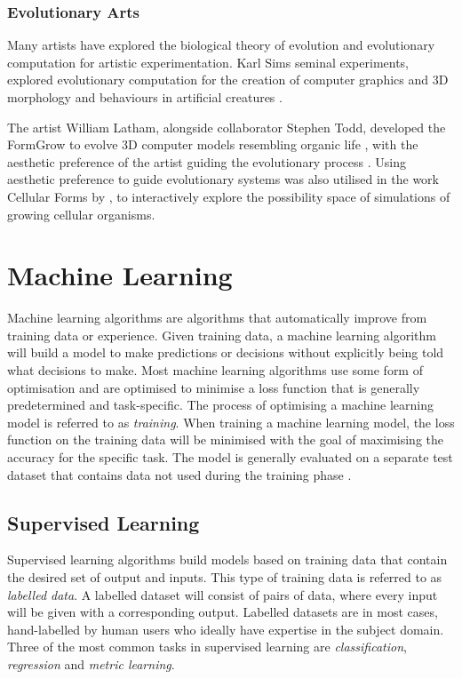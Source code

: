 \subsubsection{Evolutionary Arts}

Many artists have explored the biological theory of evolution and evolutionary computation for artistic experimentation.
Karl Sims seminal experiments, explored evolutionary computation for the creation of computer graphics \citep{sims1991artificial} and 3D morphology and behaviours in artificial creatures \citep{sims1994evolving, sims2023evolving}.

The artist William Latham, alongside collaborator Stephen Todd, developed the FormGrow to evolve 3D computer models resembling organic life \citep{latham1992evolutionary}, with the aesthetic preference of the artist guiding the evolutionary process \citep{lambert2013emergence}.
Using aesthetic preference to guide evolutionary systems was also utilised in the work Cellular Forms by \citep{lomas2014cellular}, to interactively explore the possibility space of simulations of growing cellular organisms.

\section{Machine Learning}
\label{c2:sec:ml}
Machine learning algorithms are algorithms that automatically improve from training data or experience. 
Given training data, a machine learning algorithm will build a model to make predictions or decisions without explicitly being told what decisions to make. 
Most machine learning algorithms use some form of optimisation and are optimised to minimise a loss function that is generally predetermined and task-specific. 
The process of optimising a machine learning model is referred to as \emph{training}. 
When training a machine learning model, the loss function on the training data will be minimised with the goal of maximising the accuracy for the specific task. 
The model is generally evaluated on a separate test dataset that contains data not used during the training phase \citep{murphy2012machine}.

\subsection{Supervised Learning}

Supervised learning algorithms build models based on training data that contain the desired set of output and inputs. 
This type of training data is referred to as \emph{labelled data}. 
A labelled dataset will consist of pairs of data, where every input will be given with a corresponding output. 
Labelled datasets are in most cases, hand-labelled by human users who ideally have expertise in the subject domain. 
Three of the most common tasks in supervised learning are \emph{classification}, \emph{regression} and \emph{metric learning}. 


